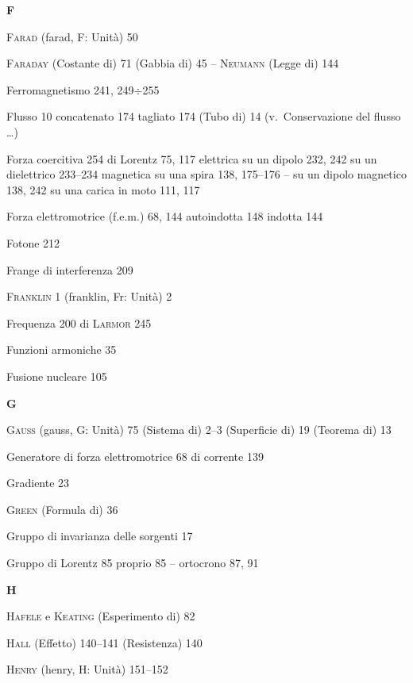 \begin{theindex}
  \indexspace
  \item \textbf{F}
  \indexspace
  \item \textsc{Farad} (farad, F: Unit\`a) 50
  \item \textsc{Faraday} (Costante di) 71
    \subitem (Gabbia di) 45
    \subitem -- \textsc{Neumann} (Legge di) 144
  \item Ferromagnetismo 241, 249$\div$255
  \item Flusso 10
    \subitem concatenato 174
    \subitem tagliato 174
    \subitem (Tubo di) 14
    \subitem (v.\ Conservazione del flusso \dots)
  \item Forza
    \subitem coercitiva 254
    \subitem di Lorentz 75, 117
    \subitem elettrica su un dipolo 232, 242
    \subitem su un dielettrico 233--234
    \subitem magnetica su una spira 138, 175--176
    \subitem -- su un dipolo magnetico 138, 242
    \subitem su una carica in moto 111, 117
  \item Forza elettromotrice (f.e.m.) 68, 144
    \subitem autoindotta 148
    \subitem indotta 144
  \item Fotone 212
  \item Frange di interferenza 209
  \item \textsc{Franklin} 1
    \subitem (franklin, Fr: Unit\`a) 2
  \item Frequenza 200
    \subitem di \textsc{Larmor} 245
  \item Funzioni armoniche 35
  \item Fusione nucleare 105

  \indexspace
  \item \textbf{G}
  \indexspace
  \item \textsc{Gauss} (gauss, G: Unit\`a) 75
    \subitem (Sistema di) 2--3
    \subitem (Superficie di) 19
    \subitem (Teorema di) 13
  \item Generatore
    \subitem di forza elettromotrice 68
    \subitem di corrente 139
  \item Gradiente 23
  \item \textsc{Green} (Formula di) 36
  \item Gruppo di invarianza delle sorgenti 17
  \item Gruppo di Lorentz 85
    \subitem proprio 85
      \subsubitem -- ortocrono 87, 91

  \indexspace
  \item \textbf{H}
  \indexspace
  \item \textsc{Hafele} e \textsc{Keating} (Esperimento di) 82
  \item \textsc{Hall} (Effetto) 140--141
    \subitem (Resistenza) 140
  \item \textsc{Henry} (henry, H: Unit\`a) 151--152


\end{theindex}
